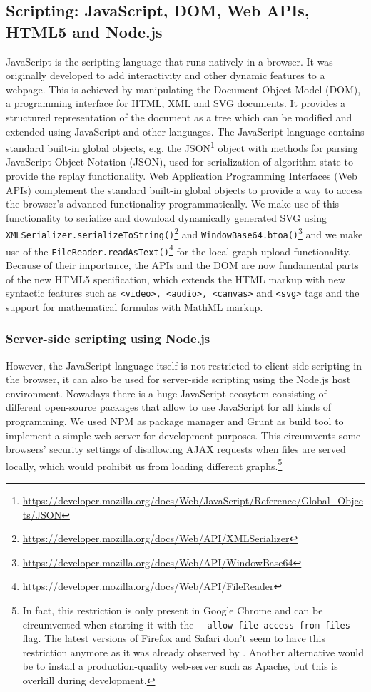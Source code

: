 \subsection{Scripting: JavaScript, DOM, Web APIs, HTML5 and Node.js}\label{sec:script}
JavaScript is the scripting language that runs natively in a browser. It was originally developed to  add interactivity and other dynamic features to a webpage. This is achieved by manipulating the Document Object Model (DOM), a programming interface for HTML, XML and SVG documents. It provides a structured representation of the document as a tree which can be modified and extended using JavaScript and other languages. The JavaScript language contains standard built-in global objects, e.g. the JSON\footnote{\url{https://developer.mozilla.org/docs/Web/JavaScript/Reference/Global_Objects/JSON}} object with methods for parsing JavaScript Object Notation (JSON), used for serialization of algorithm state to provide the replay functionality. Web Application Programming Interfaces (Web APIs) complement the standard built-in global objects to provide a way to access the browser's advanced functionality programmatically. We make use of this functionality to serialize and download dynamically generated SVG using \texttt{XMLSerializer.serializeToString()}\footnote{\url{https://developer.mozilla.org/docs/Web/API/XMLSerializer}} and \texttt{WindowBase64.btoa()}\footnote{\url{https://developer.mozilla.org/docs/Web/API/WindowBase64}} and we make use of the \texttt{FileReader.readAsText()}\footnote{\url{https://developer.mozilla.org/docs/Web/API/FileReader}} for the local graph upload functionality. Because of their importance, the APIs and the DOM are now fundamental parts of the new HTML5 specification, which extends the HTML markup with new syntactic features such as \texttt{<video>, <audio>, <canvas>} and \texttt{<svg>} tags and the support for mathematical formulas with MathML markup.

\subsubsection{Server-side scripting using Node.js} %
However, the JavaScript language itself is not restricted to client-side scripting in the browser, it can also be used for server-side scripting using the Node.js host environment. Nowadays there is a huge JavaScript ecosytem consisting of different open-source packages that allow to use JavaScript for all kinds of programming. We used NPM as package manager and Grunt as build tool to implement a simple web-server for development purposes. This circumvents some browsers' security settings of disallowing AJAX requests when files are served locally, which would prohibit us from loading different graphs.\footnote{In fact, this restriction is only present in Google Chrome and can be circumvented when starting it with the \texttt{-{}-allow-file-access-from-files} flag. The latest versions of Firefox and Safari don't seem to have this restriction anymore as it was already observed by \cite{feil2016idp}. Another alternative would be to install a production-quality web-server such as Apache, but this is overkill during development.}

